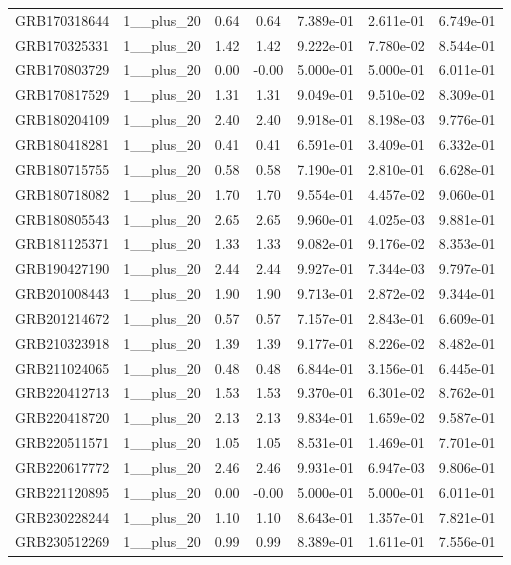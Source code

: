 \documentclass[12pt]{article}
\begin{document}
\begin{table}[h!]
{\begin{tabular}{l c c c c c c}
GRB170318644 & 1__plus_20 & 0.64 & 0.64 & 7.389e-01 & 2.611e-01 & 6.749e-01 \\
GRB170325331 & 1__plus_20 & 1.42 & 1.42 & 9.222e-01 & 7.780e-02 & 8.544e-01 \\
GRB170803729 & 1__plus_20 & 0.00 & -0.00 & 5.000e-01 & 5.000e-01 & 6.011e-01 \\
GRB170817529 & 1__plus_20 & 1.31 & 1.31 & 9.049e-01 & 9.510e-02 & 8.309e-01 \\
GRB180204109 & 1__plus_20 & 2.40 & 2.40 & 9.918e-01 & 8.198e-03 & 9.776e-01 \\
GRB180418281 & 1__plus_20 & 0.41 & 0.41 & 6.591e-01 & 3.409e-01 & 6.332e-01 \\
GRB180715755 & 1__plus_20 & 0.58 & 0.58 & 7.190e-01 & 2.810e-01 & 6.628e-01 \\
GRB180718082 & 1__plus_20 & 1.70 & 1.70 & 9.554e-01 & 4.457e-02 & 9.060e-01 \\
GRB180805543 & 1__plus_20 & 2.65 & 2.65 & 9.960e-01 & 4.025e-03 & 9.881e-01 \\
GRB181125371 & 1__plus_20 & 1.33 & 1.33 & 9.082e-01 & 9.176e-02 & 8.353e-01 \\
GRB190427190 & 1__plus_20 & 2.44 & 2.44 & 9.927e-01 & 7.344e-03 & 9.797e-01 \\
GRB201008443 & 1__plus_20 & 1.90 & 1.90 & 9.713e-01 & 2.872e-02 & 9.344e-01 \\
GRB201214672 & 1__plus_20 & 0.57 & 0.57 & 7.157e-01 & 2.843e-01 & 6.609e-01 \\
GRB210323918 & 1__plus_20 & 1.39 & 1.39 & 9.177e-01 & 8.226e-02 & 8.482e-01 \\
GRB211024065 & 1__plus_20 & 0.48 & 0.48 & 6.844e-01 & 3.156e-01 & 6.445e-01 \\
GRB220412713 & 1__plus_20 & 1.53 & 1.53 & 9.370e-01 & 6.301e-02 & 8.762e-01 \\
GRB220418720 & 1__plus_20 & 2.13 & 2.13 & 9.834e-01 & 1.659e-02 & 9.587e-01 \\
GRB220511571 & 1__plus_20 & 1.05 & 1.05 & 8.531e-01 & 1.469e-01 & 7.701e-01 \\
GRB220617772 & 1__plus_20 & 2.46 & 2.46 & 9.931e-01 & 6.947e-03 & 9.806e-01 \\
GRB221120895 & 1__plus_20 & 0.00 & -0.00 & 5.000e-01 & 5.000e-01 & 6.011e-01 \\
GRB230228244 & 1__plus_20 & 1.10 & 1.10 & 8.643e-01 & 1.357e-01 & 7.821e-01 \\
GRB230512269 & 1__plus_20 & 0.99 & 0.99 & 8.389e-01 & 1.611e-01 & 7.556e-01 \\

\end{tabular}}
\end{table}
\end{document}
